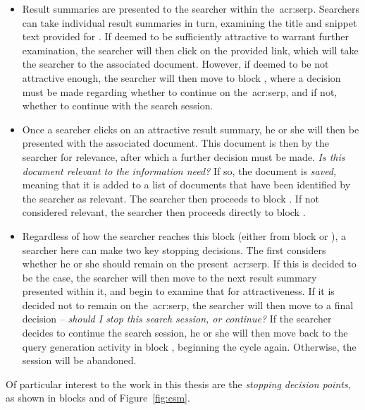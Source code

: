 \begin{itemize}
    \item[\blueboxbold{D}]{ Result summaries are presented to the searcher within the~\gls{acr:serp}. Searchers can take individual result summaries in turn, examining the title and snippet text provided for . If deemed to be sufficiently attractive to warrant further examination, the searcher will then click on the provided link, which will take the searcher to the associated document. However, if deemed to be not attractive enough, the searcher will then move to block , where a decision must be made regarding whether to continue on the~\gls{acr:serp}, and if not, whether to continue with the search session.}
    
    \item[\blueboxbold{E}]{ Once a searcher clicks on an attractive result summary, he or she will then be presented with the associated document. This document is then  by the searcher for relevance, after which a further decision must be made. \emph{Is this document relevant to the information need?} If so, the document is \emph{saved,} meaning that it is added to a list of documents that have been identified by the searcher as relevant. The searcher then proceeds to block . If not considered relevant, the searcher then proceeds directly to block .}
    
    \item[\blueboxbold{F}]{ Regardless of how the searcher reaches this block (either from block  or ), a searcher here can make two key stopping decisions. The first considers whether he or she should remain on the present~\gls{acr:serp}. If this is decided to be the case, the searcher will then move to the next result summary presented within it, and begin to examine that for attractiveness. If it is decided not to remain on the~\gls{acr:serp}, the searcher will then move to a final decision -- \emph{should I stop this search session, or continue?} If the searcher decides to continue the search session, he or she will then move back to the query generation activity in block , beginning the cycle again. Otherwise, the session will be abandoned.}
    
\end{itemize}

Of particular interest to the work in this thesis are the \emph{stopping decision points}, as shown in blocks  and  of Figure~\ref{fig:csm}.

